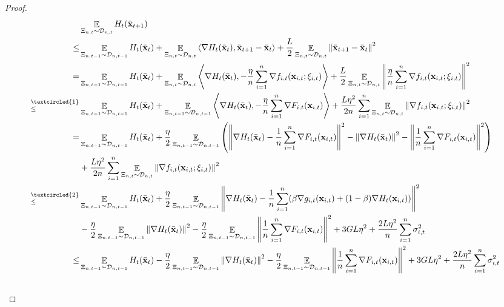 \documentclass{article}
\begin{document}
\begin{proof}
\begin{align}
\nonumber
& \EE_{ \Xi_{n,t} \sim \Dcal_{n,t} } H_t(\bar{\x}_{t+1}) \\ \nonumber
\le & \EE_{ \Xi_{n,t-1} \sim \Dcal_{n,t-1} } H_t(\bar{\x}_t) + \EE_{ \Xi_{n,t} \sim \Dcal_{n,t} }\lrangle{\nabla H_t(\bar{\x}_t), \bar{\x}_{t+1} - \bar{\x}_t} + \frac{L}{2}\EE_{ \Xi_{n,t} \sim \Dcal_{n,t} }\lrnorm{\bar{\x}_{t+1} - \bar{\x}_t}^2 \\ \nonumber
= & \EE_{ \Xi_{n,t-1} \sim \Dcal_{n,t-1} } H_t(\bar{\x}_t) + \EE_{ \Xi_{n,t} \sim \Dcal_{n,t} }\lrangle{\nabla H_t(\bar{\x}_t), -\frac{\eta}{n}\sum_{i=1}^n \nabla f_{i,t}(\x_{i,t};\xi_{i,t})} + \frac{L}{2} \EE_{ \Xi_{n,t} \sim \Dcal_{n,t} }\lrnorm{\frac{\eta}{n}\sum_{i=1}^n \nabla f_{i,t}(\x_{i,t};\xi_{i,t})}^2 \\ \nonumber
\refabovecir{\le}{\textcircled{1}} & \EE_{ \Xi_{n,t-1} \sim \Dcal_{n,t-1} } H_t(\bar{\x}_t) + \EE_{ \Xi_{n,t-1} \sim \Dcal_{n,t-1} } \lrangle{\nabla H_t(\bar{\x}_t), -\frac{\eta}{n}\sum_{i=1}^n \nabla F_{i,t}(\x_{i,t})} + \frac{L\eta^2}{2n}\sum_{i=1}^n\EE_{ \Xi_{n,t} \sim \Dcal_{n,t} }\lrnorm{ \nabla f_{i,t}(\x_{i,t};\xi_{i,t})}^2 \\ \nonumber
= & \EE_{ \Xi_{n,t-1} \sim \Dcal_{n,t-1} } H_t(\bar{\x}_t) + \frac{\eta}{2}\EE_{ \Xi_{n,t-1} \sim \Dcal_{n,t-1} } \lrincir{ \lrnorm{\nabla H_t(\bar{\x}_t) -\frac{1}{n}\sum_{i=1}^n \nabla F_{i,t}(\x_{i,t})}^2 - \lrnorm{\nabla H_t(\bar{\x}_t)}^2 - \lrnorm{\frac{1}{n}\sum_{i=1}^n \nabla F_{i,t}(\x_{i,t})}^2 } \\ \nonumber 
& + \frac{L\eta^2}{2n}\sum_{i=1}^n\EE_{ \Xi_{n,t} \sim \Dcal_{n,t} }\lrnorm{ \nabla f_{i,t}(\x_{i,t};\xi_{i,t})}^2 \\ \nonumber
\refabovecir{\le}{\textcircled{2}} & \EE_{ \Xi_{n,t-1} \sim \Dcal_{n,t-1} } H_t(\bar{\x}_t) + \frac{\eta}{2}\EE_{ \Xi_{n,t-1} \sim \Dcal_{n,t-1} } \lrnorm{\nabla H_t(\bar{\x}_t) -\frac{1}{n}\sum_{i=1}^n (\beta \nabla g_{i,t}(\x_{i,t}) + (1-\beta)\nabla H_t(\x_{i,t}))}^2 \\ \nonumber 
& - \frac{\eta}{2}\EE_{ \Xi_{n,t-1} \sim \Dcal_{n,t-1} } \lrnorm{\nabla H_t(\bar{\x}_t)}^2 - \frac{\eta}{2}\EE_{ \Xi_{n,t-1} \sim \Dcal_{n,t-1} } \lrnorm{\frac{1}{n}\sum_{i=1}^n \nabla F_{i,t}(\x_{i,t})}^2 + 3GL\eta^2  + \frac{2L\eta^2}{n}\sum_{i=1}^n \sigma_{i,t}^2 \\ \nonumber
\le & \EE_{ \Xi_{n,t-1} \sim \Dcal_{n,t-1} } H_t(\bar{\x}_t) - \frac{\eta}{2}\EE_{ \Xi_{n,t-1} \sim \Dcal_{n,t-1} }\lrnorm{\nabla H_t(\bar{\x}_t)}^2 - \frac{\eta}{2}\EE_{ \Xi_{n,t-1} \sim \Dcal_{n,t-1} }\lrnorm{\frac{1}{n}\sum_{i=1}^n \nabla F_{i,t}(\x_{i,t})}^2  + 3GL\eta^2  + \frac{2L\eta^2}{n}\sum_{i=1}^n \sigma_{i,t}^2 \\ \nonumber

\end{align}
\end{proof}
\end{document}
